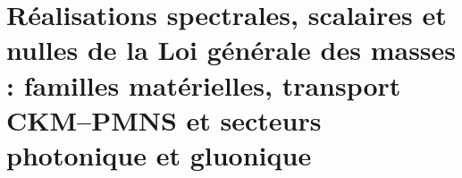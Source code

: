 \chapter{Réalisations spectrales, scalaires et nulles de la Loi générale des masses : familles matérielles, transport CKM--PMNS et secteurs photonique et gluonique}
\label{chap:md-realizaciones-masicas-definitivo}
\begingroup
\let\HMTOwnerSection\section
\let\HMTOwnerSubsection\subsection
\let\HMTOwnerSubsubsection\subsubsection
\let\HMTOwnerParagraph\paragraph
\let\chapter\HMTOwnerSection
\let\section\HMTOwnerSubsection
\let\subsection\HMTOwnerSubsubsection
\let\subsubsection\HMTOwnerParagraph

\endgroup
\begingroup
\renewcommand{\chapter}[2][]{}%

\endgroup


